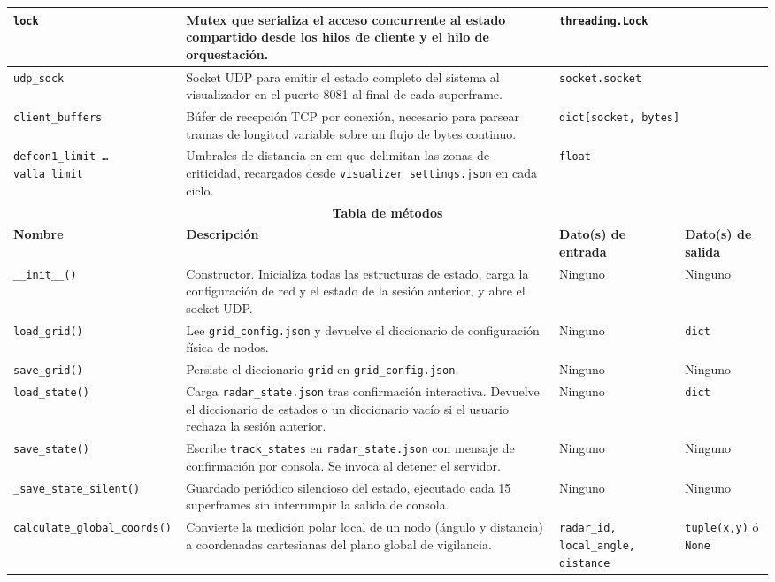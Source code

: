 \begin{table}[H]
{\begin{tabular}{|p{5cm}|p{9.5cm}|p{4cm}|p{3cm}|}
\hline
\texttt{lock} & Mutex que serializa el acceso concurrente al estado compartido desde los hilos de cliente y el hilo de orquestación. & \multicolumn{2}{l|}{\texttt{threading.Lock}} \\
\hline
\texttt{udp\_sock} & Socket UDP para emitir el estado completo del sistema al visualizador en el puerto 8081 al final de cada superframe. & \multicolumn{2}{l|}{\texttt{socket.socket}} \\
\hline
\texttt{client\_buffers} & Búfer de recepción TCP por conexión, necesario para parsear tramas de longitud variable sobre un flujo de bytes continuo. & \multicolumn{2}{l|}{\texttt{dict[socket, bytes]}} \\
\hline
\texttt{defcon1\_limit \ldots valla\_limit} & Umbrales de distancia en cm que delimitan las zonas de criticidad, recargados desde \texttt{visualizer\_settings.json} en cada ciclo. & \multicolumn{2}{l|}{\texttt{float}} \\
\hline
\multicolumn{4}{|c|}{\textbf{Tabla de métodos}} \\
\hline
\textbf{Nombre} & \textbf{Descripción} & \textbf{Dato(s) de entrada} & \textbf{Dato(s) de salida} \\
\hline
\texttt{\_\_init\_\_()} & Constructor. Inicializa todas las estructuras de estado, carga la configuración de red y el estado de la sesión anterior, y abre el socket UDP. & Ninguno & Ninguno \\
\hline
\texttt{load\_grid()} & Lee \texttt{grid\_config.json} y devuelve el diccionario de configuración física de nodos. & Ninguno & \texttt{dict} \\
\hline
\texttt{save\_grid()} & Persiste el diccionario \texttt{grid} en \texttt{grid\_config.json}. & Ninguno & Ninguno \\
\hline
\texttt{load\_state()} & Carga \texttt{radar\_state.json} tras confirmación interactiva. Devuelve el diccionario de estados o un diccionario vacío si el usuario rechaza la sesión anterior. & Ninguno & \texttt{dict} \\
\hline
\texttt{save\_state()} & Escribe \texttt{track\_states} en \texttt{radar\_state.json} con mensaje de confirmación por consola. Se invoca al detener el servidor. & Ninguno & Ninguno \\
\hline
\texttt{\_save\_state\_silent()} & Guardado periódico silencioso del estado, ejecutado cada 15 superframes sin interrumpir la salida de consola. & Ninguno & Ninguno \\
\hline
\texttt{calculate\_global\_coords()} & Convierte la medición polar local de un nodo (ángulo y distancia) a coordenadas cartesianas del plano global de vigilancia. & \texttt{radar\_id, local\_angle, distance} & \texttt{tuple(x,y)} ó \texttt{None} \\

\end{tabular}}
\end{table}
